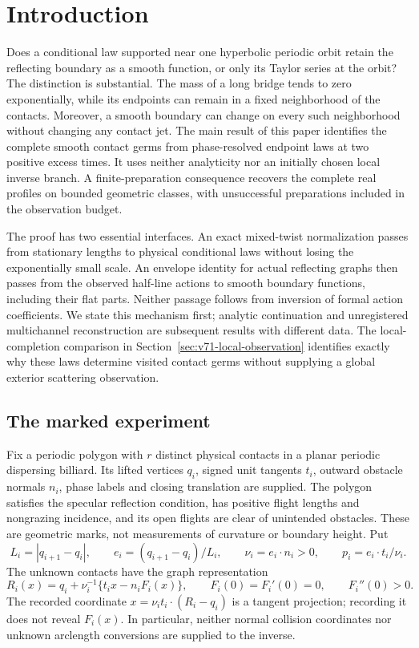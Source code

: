 \section{Introduction}
\label{sec:v70-introduction}

Does a conditional law supported near one hyperbolic periodic orbit
retain the reflecting boundary as a smooth function, or only its Taylor
series at the orbit?  The distinction is substantial.  The mass of a long
bridge tends to zero exponentially, while its endpoints can remain in a
fixed neighborhood of the contacts.  Moreover, a smooth boundary can
change on every such neighborhood without changing any contact jet.
The main result of this paper identifies the complete smooth contact
germs from phase-resolved endpoint laws at two positive excess times.
It uses neither analyticity nor an initially chosen local inverse branch.
A finite-preparation consequence recovers the complete real profiles on
bounded geometric classes, with unsuccessful preparations included in
the observation budget.

The proof has two essential interfaces.  An exact mixed-twist
normalization passes from stationary lengths to physical conditional
laws without losing the exponentially small scale.  An envelope identity
for actual reflecting graphs then passes from the observed half-line
actions to smooth boundary functions, including their flat parts.
Neither passage follows from inversion of formal action coefficients.
We state this mechanism first; analytic continuation and unregistered
multichannel reconstruction are subsequent results with different data.
The local-completion comparison in Section~\ref{sec:v71-local-observation}
identifies exactly why these laws determine visited contact germs without
supplying a global exterior scattering observation.

\subsection{The marked experiment}

Fix a periodic polygon with $r$ distinct physical contacts in a planar
periodic dispersing billiard.  Its lifted vertices $q_i$, signed unit
tangents $t_i$, outward obstacle normals $n_i$, phase labels and closing
translation are supplied.  The polygon satisfies the specular reflection
condition, has positive flight lengths and nongrazing incidence, and its
open flights are clear of unintended obstacles.  These are geometric
marks, not measurements of curvature or boundary height.  Put
\[
 L_i=|q_{i+1}-q_i|,\qquad e_i=(q_{i+1}-q_i)/L_i,\qquad
 \nu_i=e_i\cdot n_i>0,\qquad p_i=e_i\cdot t_i/\nu_i.
\]
The unknown contacts have the graph representation
\begin{equation}\label{eq:v70-graphs}
 R_i(x)=q_i+\nu_i^{-1}\{t_i x-n_iF_i(x)\},\qquad
 F_i(0)=F_i'(0)=0,\qquad F_i''(0)>0.
\end{equation}
The recorded coordinate $x=\nu_i t_i\cdot(R_i-q_i)$ is a tangent
projection; recording it does not reveal $F_i(x)$.  In particular,
neither normal collision coordinates nor unknown arclength conversions
are supplied to the inverse.

